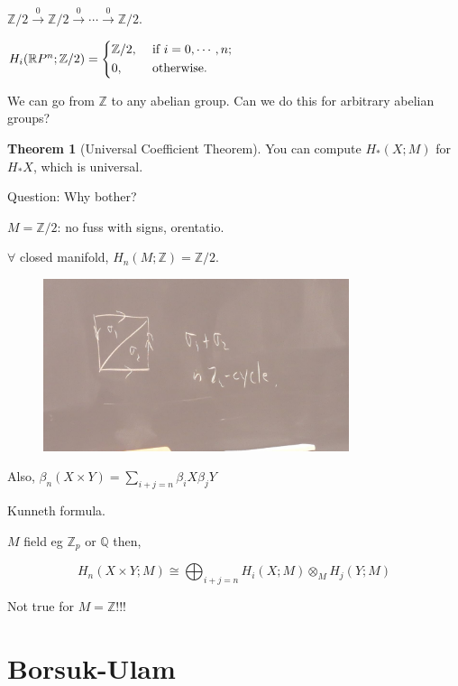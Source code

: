 \documentclass{article}
\theoremstyle{definition}
\newtheorem{theorem}{Theorem}
\begin{document}
    \(\mathbb{Z} / 2 \xrightarrow{0} \mathbb{Z} / 2 \xrightarrow{0} \cdots \xrightarrow{0} \mathbb{Z} / 2\).

    \(H_i(\mathbb{R} P^n; \mathbb{Z} / 2) = \begin{dcases}
        \mathbb{Z} / 2, &\text{ if } i = 0, \cdots , n ;\\
        0, &\text{ otherwise} .
    \end{dcases}\) 

    We can go from \(\mathbb{Z}\) to any abelian group. Can we do this for arbitrary abelian groups?

    \begin{theorem}
        [Universal Coefficient Theorem] You can compute \(H_{\ast} (X;M)\) for \(H_{\ast} X\),  which is universal.
    \end{theorem}

    Question: Why bother?

    \(M = \mathbb{Z} / 2\): no fuss with signs, orentatio.

    \(\forall\) closed manifold, \(H_n(M;\mathbb{Z}) = \mathbb{Z} / 2\).

    \begin{figure}[H]
        \centering
        \includegraphics[width=0.8\textwidth]{img/z2cycle}
    \end{figure}

    Also, \(\beta_n(X \times Y) = \sum_{i+j=n} \beta_i X \beta_j Y\)
    
    Kunneth formula.

    \(M\) field eg \(\mathbb{Z}_p\) or \(\mathbb{Q}\) then,

    \[
        H_n(X \times Y; M) \cong \bigoplus_{i+j=n} H_i(X;M) \otimes_M H_j(Y;M) 
    \]

    Not true for \(M = \mathbb{Z}\)!!!

    \section*{Borsuk-Ulam}
\end{document}

